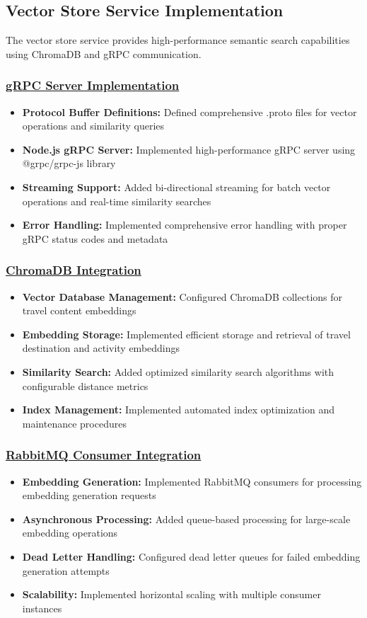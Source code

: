 \subsection{Vector Store Service Implementation}
The vector store service provides high-performance semantic search capabilities using ChromaDB and gRPC communication.

\subsubsection*{\underline{gRPC Server Implementation}}
\begin{itemize}
    \item \textbf{Protocol Buffer Definitions:} Defined comprehensive .proto files for vector operations and similarity queries
    \item \textbf{Node.js gRPC Server:} Implemented high-performance gRPC server using @grpc/grpc-js library
    \item \textbf{Streaming Support:} Added bi-directional streaming for batch vector operations and real-time similarity searches
    \item \textbf{Error Handling:} Implemented comprehensive error handling with proper gRPC status codes and metadata
\end{itemize}

\subsubsection*{\underline{ChromaDB Integration}}
\begin{itemize}
    \item \textbf{Vector Database Management:} Configured ChromaDB collections for travel content embeddings
    \item \textbf{Embedding Storage:} Implemented efficient storage and retrieval of travel destination and activity embeddings
    \item \textbf{Similarity Search:} Added optimized similarity search algorithms with configurable distance metrics
    \item \textbf{Index Management:} Implemented automated index optimization and maintenance procedures
\end{itemize}

\subsubsection*{\underline{RabbitMQ Consumer Integration}}
\begin{itemize}
    \item \textbf{Embedding Generation:} Implemented RabbitMQ consumers for processing embedding generation requests
    \item \textbf{Asynchronous Processing:} Added queue-based processing for large-scale embedding operations
    \item \textbf{Dead Letter Handling:} Configured dead letter queues for failed embedding generation attempts
    \item \textbf{Scalability:} Implemented horizontal scaling with multiple consumer instances
\end{itemize}


